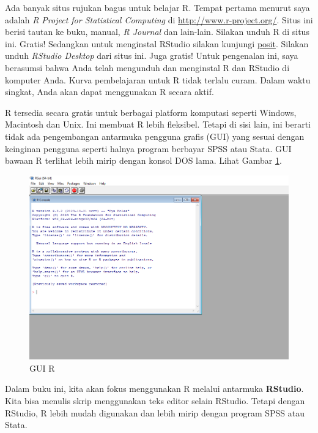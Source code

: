 \documentclass[a4paper, nobind]{templates/ociamthesis}
\begin{document}
\minitoc 

Ada banyak situs rujukan bagus untuk belajar R. Tempat pertama menurut saya adalah \emph{R Project for Statistical Computing} di \url{http://www.r-project.org/}. Situs ini berisi tautan ke buku, manual, \emph{R Journal} dan lain-lain. Silakan unduh R di situs ini. Gratis! Sedangkan untuk menginstal RStudio silakan kunjungi \href{https://posit.co/download/rstudio-desktop/}{posit}. Silakan unduh \emph{RStudio Desktop} dari situs ini. Juga gratis! Untuk pengenalan ini, saya berasumsi bahwa Anda telah mengunduh dan menginstal R dan RStudio di komputer Anda. Kurva pembelajaran untuk R tidak terlalu curam. Dalam waktu singkat, Anda akan dapat menggunakan R secara aktif.

R tersedia secara gratis untuk berbagai platform komputasi seperti Windows, Macintosh dan Unix. Ini membuat R lebih fleksibel. Tetapi di sisi lain, ini berarti tidak ada pengembangan antarmuka pengguna grafis (GUI) yang sesuai dengan keinginan pengguna seperti halnya program berbayar SPSS atau Stata. GUI bawaan R terlihat lebih mirip dengan konsol DOS lama. Lihat Gambar \ref{fig:rgui}.

\begin{figure}[H]
\includegraphics[width=1\linewidth]{figures/console432} \caption{GUI R}\label{fig:rgui}
\end{figure}

Dalam buku ini, kita akan fokus menggunakan R melalui antarmuka \textbf{RStudio}. Kita bisa menulis skrip menggunakan teks editor selain RStudio. Tetapi dengan RStudio, R lebih mudah digunakan dan lebih mirip dengan program SPSS atau Stata.
\end{document}

